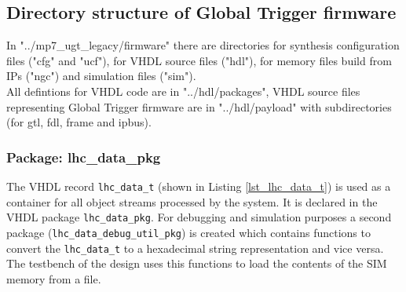 \subsection{Directory structure of Global Trigger firmware} \label{dir_struct_gt_fw}

In "../mp7\_ugt\_legacy/firmware" there are directories for synthesis configuration files ("cfg" and "ucf"), for VHDL source files ("hdl"), for memory files build from IPs ("ngc") and simulation files ("sim").\\
All defintions for VHDL code are in "../hdl/packages", VHDL source files representing Global Trigger firmware are in "../hdl/payload" with subdirectories (for gtl, fdl, frame and ipbus).

\subsubsection{Package: lhc\_data\_pkg} \label{section_lhc_data_pkg}

The VHDL record \texttt{lhc\_data\_t} (shown in Listing \ref{lst_lhc_data_t}) is used as a container for all object streams processed by the system. It is declared in the VHDL package \texttt{lhc\_data\_pkg}.
For debugging and simulation purposes a second package (\texttt{lhc\_data\_debug\_util\_pkg}) is created which contains functions to convert the \texttt{lhc\_data\_t} to a hexadecimal string representation and vice versa. The testbench of the design uses this functions to load the contents of the SIM memory from a file.



\clearpage

